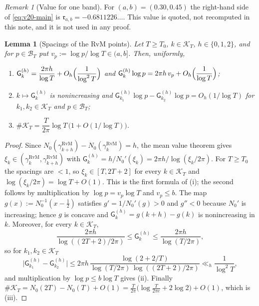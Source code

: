 \documentclass[11pt,a4paper]{article}
\numberwithin{equation}{section}
\newtheorem{lemma}[theorem]{Lemma}
\theoremstyle{definition}
\theoremstyle{remark}
\newtheorem{remark}[theorem]{Remark}
\begin{document}
\begin{remark}[Value for one band]\label{rem:v20-value}
For $(a,b)=(0.30,0.45)$ the right-hand side of \eqref{eq:v20-main} is $\mathfrak r_{a,b}=-0.6811226\ldots$. This value is quoted, not recomputed in this note, and it is not used in any proof.
\end{remark}

\begin{lemma}[Spacings of the RvM points]\label{lem:v20-spacing}
Let $T\ge T_0$, $k\in\mathcal K_T$, $h\in\{0,1,2\}$, and for $p\in\mathcal B_T$ put $v_p:=\log p/\log T\in(a,b]$. Then, uniformly,
\begin{enumerate}[label=(\roman*),leftmargin=*]
\item $\mathsf G_k^{(h)}=\dfrac{2\pi h}{\log T}+O_h\Bigl(\dfrac1{\log^2T}\Bigr)$ and $\mathsf G_k^{(h)}\log p=2\pi h\,v_p+O_h\Bigl(\dfrac1{\log T}\Bigr)$;
\item $k\mapsto\mathsf G_k^{(h)}$ is nonincreasing and $\mathsf G_{k_1}^{(h)}\log p-\mathsf G_{k_2}^{(h)}\log p=O_h(1/\log T)$ for $k_1,k_2\in\mathcal K_T$ and $p\in\mathcal B_T$;
\item $\#\mathcal K_T=\dfrac T{2\pi}\log T\,\bigl(1+O(1/\log T)\bigr)$.
\end{enumerate}
\end{lemma}
\begin{proof}
Since $N_0(\gamma^{\mathrm{RvM}}_{k+h})-N_0(\gamma^{\mathrm{RvM}}_k)=h$, the mean value theorem gives $\xi_k\in(\gamma^{\mathrm{RvM}}_k,\gamma^{\mathrm{RvM}}_{k+h})$ with $\mathsf G_k^{(h)}=h/N_0'(\xi_k)=2\pi h/\log(\xi_k/2\pi)$. For $T\ge T_0$ the spacings are $<1$, so $\xi_k\in[T,2T+2]$ for every $k\in\mathcal K_T$ and $\log(\xi_k/2\pi)=\log T+O(1)$. This is the first formula of (i); the second follows by multiplication by $\log p=v_p\log T$ and $v_p\le b$. The map $g(x):=N_0^{-1}(x-\frac12)$ satisfies $g'=1/N_0'(g)>0$ and $g''<0$ because $N_0'$ is increasing; hence $g$ is concave and $\mathsf G_k^{(h)}=g(k+h)-g(k)$ is nonincreasing in $k$. Moreover, for every $k\in\mathcal K_T$,
\begin{equation}
 \frac{2\pi h}{\log((2T+2)/2\pi)}\le\mathsf G_k^{(h)}\le\frac{2\pi h}{\log(T/2\pi)},
\end{equation}
so for $k_1,k_2\in\mathcal K_T$
\begin{equation}
 \bigl|\mathsf G_{k_1}^{(h)}-\mathsf G_{k_2}^{(h)}\bigr|\le2\pi h\,\frac{\log(2+2/T)}{\log(T/2\pi)\,\log((2T+2)/2\pi)}\ll_h\frac1{\log^2T},
\end{equation}
and multiplication by $\log p\le b\log T$ gives (ii). Finally $\#\mathcal K_T=N_0(2T)-N_0(T)+O(1)=\frac T{2\pi}\bigl(\log\frac T{2\pi e}+2\log2\bigr)+O(1)$, which is (iii).
\end{proof}
\end{document}
